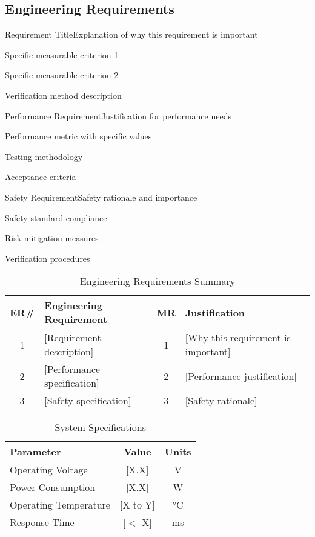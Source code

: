 \documentclass[final]{../designreport}
\newcommand{\engineeringreqs}{\subsection{Engineering Requirements}}
\begin{document}
\engineeringreqs

\begin{engineeringreq}{1}{Requirement Title}{Explanation of why this requirement is important}
    \item Specific measurable criterion 1
    \item Specific measurable criterion 2
    \item Verification method description
\end{engineeringreq}

\begin{engineeringreq}{2}{Performance Requirement}{Justification for performance needs}
    \item Performance metric with specific values
    \item Testing methodology
    \item Acceptance criteria
\end{engineeringreq}

\begin{engineeringreq}{3}{Safety Requirement}{Safety rationale and importance}
    \item Safety standard compliance
    \item Risk mitigation measures
    \item Verification procedures
\end{engineeringreq}

\begin{table}[htbp]
\centering
\caption{Engineering Requirements Summary}
\renewcommand{\arraystretch}{1.5}
\setlength{\tabcolsep}{8pt}
\begin{tabular}{|c|p{4cm}|c|p{4cm}|}
\hline
ER\# & Engineering Requirement & MR & Justification \\
\hline
1 & [Requirement description] & 1 & [Why this requirement is important] \\
\hline
2 & [Performance specification] & 2 & [Performance justification] \\
\hline
3 & [Safety specification] & 3 & [Safety rationale] \\
\hline
\end{tabular}
\end{table}

\begin{table}[htbp]
\centering
\caption{System Specifications}
\renewcommand{\arraystretch}{1.5}
\setlength{\tabcolsep}{10pt}
\begin{tabular}{lcc}
\toprule
Parameter & Value & Units \\
\midrule
Operating Voltage & [X.X] & V \\
Power Consumption & [X.X] & W \\
Operating Temperature & [X to Y] & °C \\
Response Time & [$<$ X] & ms \\
\bottomrule
\end{tabular}
\end{table}
\end{document}
